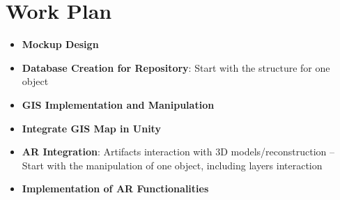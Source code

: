 
%

\chapter{Work Plan}
\label{cha:work_plan}


\begin{itemize}
    \item \textbf{Mockup Design}
    \item \textbf{Database Creation for Repository}: Start with the structure for one object
    \item \textbf{GIS Implementation and Manipulation}
    \item \textbf{Integrate GIS Map in Unity}
    \item \textbf{AR Integration}: Artifacts interaction with 3D models/reconstruction – Start with the manipulation of one object, including layers interaction
    \item \textbf{Implementation of AR Functionalities}
\end{itemize}


